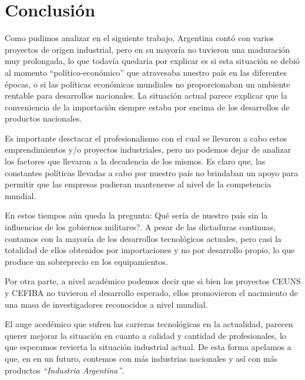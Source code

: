 \documentclass[%
  	final,
%
	notitlepage,
	narroweqnarray,
	inline,
 	twoside,
	]{ieee}
\begin{document}
\section{Conclusi\'on}

Como pudimos analizar en el siguiente trabajo, Argentina cont\'o con varios proyectos de origen industrial, pero en su mayor\'ia no tuvieron una maduraci\'on muy prolongada, lo que todav\'ia quedar\'ia por explicar es si esta situaci\'on se debi\'o al momento ``pol\'itico-econ\'omico'' que atravesaba nuestro pa\'is en las diferentes \'epocas, o si las pol\'iticas econ\'omicas mundiales no proporcionaban un ambiente rentable para desarrollos nacionales. La situaci\'on actual parece explicar que la conveniencia de la importaci\'on siempre estaba por encima de los desarrollos de productos nacionales.

Es importante desctacar el profesionalismo con el cual se llevaron a cabo estos emprendimientos y/o proyectos industriales, pero no podemos dejar de analizar los factores que llevaron a la decadencia de los mismos. Es claro que, las constantes pol\'iticas llevadas a cabo por nuestro pa\'is no brindaban un apoyo para permitir que las empresas pudieran mantenerse al nivel de la competencia mundial.

En estos tiempos a\'un queda la pregunta: \textquestiondown Qu\'e ser\'ia de nuestro pa\'is sin la influencias de los gobiernos militares?.
A pesar de las dictaduras continuas, contamos con la mayor\'ia de los desarrollos tecnol\'ogicos actuales, pero casi la totalidad de ellos obtenidos por importaciones y no por desarrollo propio, lo que produce un sobreprecio en los equipamientos.


Por otra parte, a nivel acad\'emico podemos decir que si bien los proyectos CEUNS y CEFIBA no tuvieron el desarrollo esperado, ellos promovieron el nacimiento de una masa de investigadores reconocidos a nivel mundial.

El auge aced\'emico que sufren las carreras tecnol\'ogicas en la actualidad, parecen querer mejorar la situaci\'on en cuanto a calidad y cantidad de profesionales, lo que esperamos revierta la situaci\'on industrial actual. De esta forma apelamos a que, en en un futuro, contemos con m\'as industrias nacionales y as\'i con m\'as productos \textit{``Industria Argentina''}.
\end{document}

